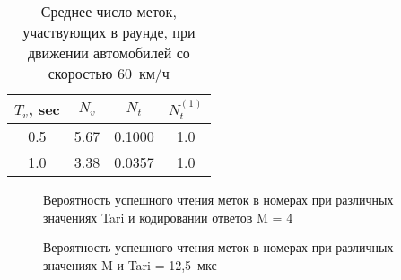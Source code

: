 \begin{table}[h]
	\renewcommand{\arraystretch}{1.3}
	\caption{Среднее число меток, участвующих в раунде, при движении автомобилей со скоростью 60~км/ч}
	\label{table:ch2_tags_num_per_round}
	\centering
	\begin{tabular}{|c|c|c|c|}
		\hline
		$T_v$, sec & $N_v$ & $N_t$ & $N_t^{(1)}$ \\\hline
		0.5 & 5.67 & 0.1000 & 1.0 \\\hline
		1.0 & 3.38 & 0.0357 & 1.0 \\\hline
		\end{tabular}
\end{table}


\begin{figure}[h]
	\caption{Вероятность успешного чтения меток в номерах при различных значениях Tari и кодировании ответов M = 4}
	\label{fig:ch2_tag_identification_m4}
\end{figure}

\begin{figure}[h]
	\caption{Вероятность успешного чтения меток в номерах при различных значениях M и Tari = 12,5~мкс}
	\label{fig:ch2_tag_identification_tari125}
\end{figure}

